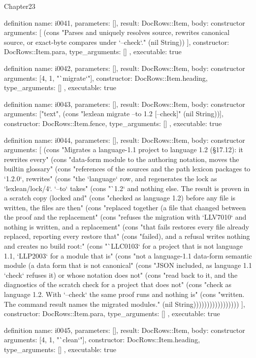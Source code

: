\begin{lexlean}{Chapter23}
\begin{semanticmodule}
definition{
  name: i0041,
  parameters: [],
  result: DocRows::Item,
  body: constructor{
    arguments: [
      (cons "Parses and uniquely resolves source, rewrites canonical source, or exact-byte compares under `--check`." (nil String))
    ],
    constructor: DocRows::Item.para,
    type_arguments: []
  },
  executable: true
}

definition{
  name: i0042,
  parameters: [],
  result: DocRows::Item,
  body: constructor{
    arguments: [4, 1, "`migrate`"],
    constructor: DocRows::Item.heading,
    type_arguments: []
  },
  executable: true
}

definition{
  name: i0043,
  parameters: [],
  result: DocRows::Item,
  body: constructor{
    arguments: ["text", (cons "lexlean migrate --to 1.2 [--check]" (nil String))],
    constructor: DocRows::Item.fence,
    type_arguments: []
  },
  executable: true
}

definition{
  name: i0044,
  parameters: [],
  result: DocRows::Item,
  body: constructor{
    arguments: [
      (cons "Migrates a language-1.1 project to language 1.2 (§17.12): it rewrites every" (cons "data-form module to the authoring notation, moves the builtin glossary" (cons "references of the sources and the path lexicon packages to `1.2.0`, rewrites" (cons "the `language` row, and regenerates the lock as `lexlean/lock/4`. `--to` takes" (cons "`1.2` and nothing else. The result is proven in a scratch copy (locked and" (cons "checked as language 1.2) before any file is written, the files are then" (cons "replaced together (a file that changed between the proof and the replacement" (cons "refuses the migration with `LLV7010` and nothing is written, and a replacement" (cons "that fails restores every file already replaced, reporting every restore that" (cons "failed), and a refusal writes nothing and creates no build root:" (cons "`LLC0103` for a project that is not language 1.1, `LLP2003` for a module that is" (cons "not a language-1.1 data-form semantic module (a data form that is not canonical" (cons "JSON included, as language 1.1 `check` refuses it) or whose notation does not" (cons "read back to it, and the diagnostics of the scratch check for a project that does not" (cons "check as language 1.2. With `--check` the same proof runs and nothing is" (cons "written. The command result names the migrated modules." (nil String)))))))))))))))))
    ],
    constructor: DocRows::Item.para,
    type_arguments: []
  },
  executable: true
}

definition{
  name: i0045,
  parameters: [],
  result: DocRows::Item,
  body: constructor{
    arguments: [4, 1, "`clean`"],
    constructor: DocRows::Item.heading,
    type_arguments: []
  },
  executable: true
}


\end{semanticmodule}
\end{lexlean}
